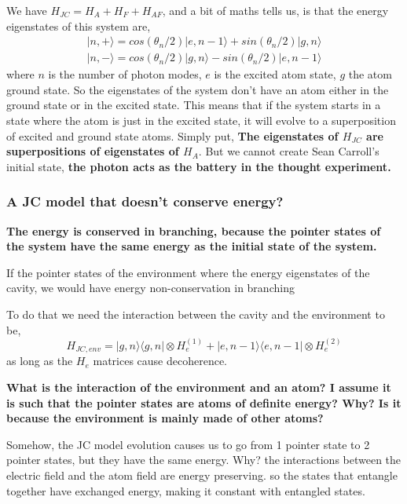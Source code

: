 \documentclass{article}
\begin{document}
We have $H_{JC}=H_A+H_F+H_{AF}$, and a bit of maths tells us, is that the energy eigenstates of this system are,
\begin{align}
    |n,+\rangle=cos(\theta_n/2)|e,n-1\rangle+sin(\theta_n/2)|g,n\rangle\\
    |n,-\rangle=cos(\theta_n/2)|g,n\rangle-sin(\theta_n/2)|e,n-1\rangle
\end{align}
where $n$ is the number of photon modes, $e$ is the excited atom state, $g$ the atom ground state. So the eigenstates of the system don't have an atom either in the ground state or in the excited state. This means that if the system starts in a state where the atom is just in the excited state, it will evolve to a superposition of excited and ground state atoms. Simply put, \textbf{The eigenstates of $H_{JC}$ are superpositions of eigenstates of $H_A$}. But we cannot create Sean Carroll's initial state, \textbf{the photon acts as the battery in the thought experiment.}\\

\subsubsection{A JC model that doesn't conserve energy?}
\textbf{The energy is conserved in branching, because the pointer states of the system have the same energy as the initial state of the system.}

If the pointer states of the environment where the energy eigenstates of the cavity, we would have energy non-conservation in branching

To do that we need the interaction between the cavity and the environment to be,
\begin{equation}
    H_{JC,env}=|g,n\rangle\langle g,n|\otimes H^{(1)}_{e}+|e,n-1\rangle\langle e,n-1|\otimes H^{(2)}_{e}
\end{equation}
as long as the $H_e$ matrices cause decoherence.

\textbf{What is the interaction of the environment and an atom? I assume it is such that the pointer states are atoms of definite energy? Why? Is it because the environment is mainly made of other atoms?}

Somehow, the JC model evolution causes us to go from 1 pointer state to 2 pointer states, but they have the same energy. Why?
the interactions between the electric field and the atom field are energy preserving. so the states that entangle together have exchanged energy, making it constant with entangled states.
\end{document}
